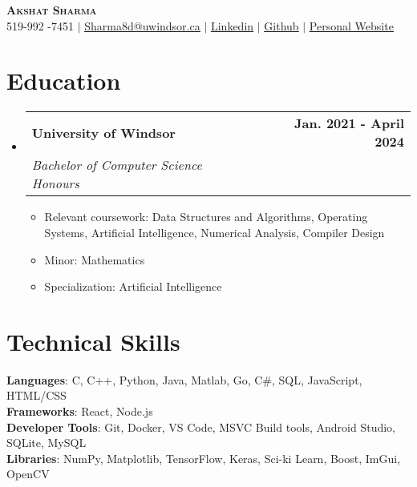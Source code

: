 \documentclass[letterpaper,11pt]{article}
\makeatletter
\newcommand{\resumeItem}[1]{
  \item\small{
    {#1 \vspace{-2pt}}
  }
}
\newcommand{\resumeSubheading}[4]{
  \vspace{-2pt}\item
    \begin{tabular*}{0.97\textwidth}[t]{l@{\extracolsep{\fill}}r}
      \textbf{#1} & #2 \\
      \textit{\small#3} & \textit{\small #4} \\
    \end{tabular*}\vspace{-7pt}
}
\newcommand{\resumeSubHeadingListStart}{\begin{itemize}[leftmargin=0.15in, label={}]}
\newcommand{\resumeSubHeadingListEnd}{\end{itemize}}
\newcommand{\resumeItemListStart}{\begin{itemize}}
\newcommand{\resumeItemListEnd}{\end{itemize}\vspace{-5pt}}
\makeatother
\begin{document}

\begin{center}
    \textbf{\Huge \scshape Akshat Sharma} \\ \vspace{1pt}
    \small 519-992 -7451 $|$ \href{mailto:sharma8d@uwindsor.ca}{\underline{Sharma8d@uwindsor.ca}} $|$ 
    \href{https://www.linkedin.com/in/akshat8d/}{\underline{Linkedin}} $|$
    \href{https://github.com/Cyoger}{\underline{Github}} $|$
    \href{https://sharma8d.netlify.app}{\underline{Personal Website}}
\end{center}


\section{Education}
  \resumeSubHeadingListStart
    \resumeSubheading
      {University of Windsor}{\textbf{Jan. 2021 - April 2024}}
      {Bachelor of Computer Science Honours}{}
        \resumeItemListStart{}
          \resumeItem{Relevant coursework: Data Structures and Algorithms, Operating Systems, Artificial Intelligence, Numerical Analysis, Compiler Design}
          \resumeItem{Minor: Mathematics}
          \resumeItem{Specialization: Artificial Intelligence}
        \resumeItemListEnd
  \resumeSubHeadingListEnd

%
\section{Technical Skills}
 \begin{itemize}[leftmargin=0.15in, label={}]
    \small{\item{
     \textbf{Languages}{: C, C++, Python, Java, Matlab, Go, C\#, SQL, JavaScript, HTML/CSS} \\
     \textbf{Frameworks}{: React, Node.js} \\
     \textbf{Developer Tools}{: Git, Docker, VS Code, MSVC Build tools, Android Studio, SQLite, MySQL } \\
     \textbf{Libraries}{: NumPy, Matplotlib, TensorFlow, Keras, Sci-ki Learn, Boost, ImGui, OpenCV}
    }}
 \end{itemize}
\end{document}
